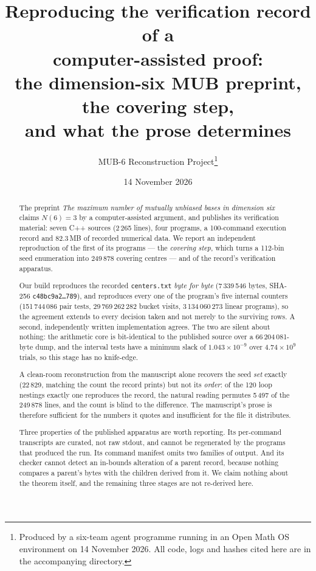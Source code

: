 \documentclass[11pt,a4paper]{article}
\title{\bfseries Reproducing the verification record of a\\ computer-assisted proof:\\[2pt]
the dimension-six MUB preprint, the covering step,\\ and what the prose determines}
\author{MUB-6 Reconstruction Project\thanks{Produced by a six-team agent programme running in an
Open Math OS environment on 14 November 2026. All code, logs and hashes cited here are in the
accompanying \code{mub6-recreate/} directory.}}
\date{14 November 2026}
\newcommand{\code}[1]{\texttt{\small #1}}
\newcommand{\sha}[1]{\texttt{\scriptsize #1}}
\begin{document}
\maketitle

\begin{abstract}
\noindent
The preprint \emph{The maximum number of mutually unbiased bases in dimension six}
\citep{OpenAIMUB2026} claims $N(6)=3$ by a computer-assisted argument, and publishes its verification
material: seven C++ sources (2\,265 lines), four programs, a 100-command execution record and 82.3\,MB of
recorded numerical data. We report an independent reproduction of the first
of its programs --- the \emph{covering step}, which turns a 112-bin seed enumeration into 249\,878
covering centres --- and of the record's verification apparatus.

Our build reproduces the recorded \code{centers.txt} \emph{byte for byte} (7\,339\,546 bytes,
SHA-256 \sha{c48bc9a2\ldots789}), and reproduces every one of the program's five internal counters
(151\,744\,086 pair tests, 29\,769\,262\,282 bucket visits, 3\,134\,060\,273 linear programs), so the
agreement extends to every decision taken and not merely to the surviving rows. A second,
independently written implementation agrees. The two are silent about nothing: the arithmetic core is
bit-identical to the published source over a 66\,204\,081-byte dump, and the interval tests have a
minimum slack of $1.043\times10^{-9}$ over $4.74\times10^{9}$ trials, so this stage has no
knife-edge.

A clean-room reconstruction from the manuscript alone recovers the seed \emph{set} exactly (22\,829,
matching the count the record prints) but not its \emph{order}: of the 120 loop nestings exactly one
reproduces the record, the natural reading permutes 5\,497 of the 249\,878 lines, and the count is
blind to the difference. The manuscript's prose is therefore sufficient for the numbers it quotes and
insufficient for the file it distributes.

Three properties of the published apparatus are worth reporting. Its per-command transcripts are
curated, not raw stdout, and cannot be regenerated by the programs that produced the run. Its command
manifest omits two families of output. And its checker cannot detect an in-bounds alteration of a
parent record, because nothing compares a parent's bytes with the children derived from it. We claim
nothing about the theorem itself, and the remaining three stages are not re-derived here.
\end{abstract}
\end{document}
